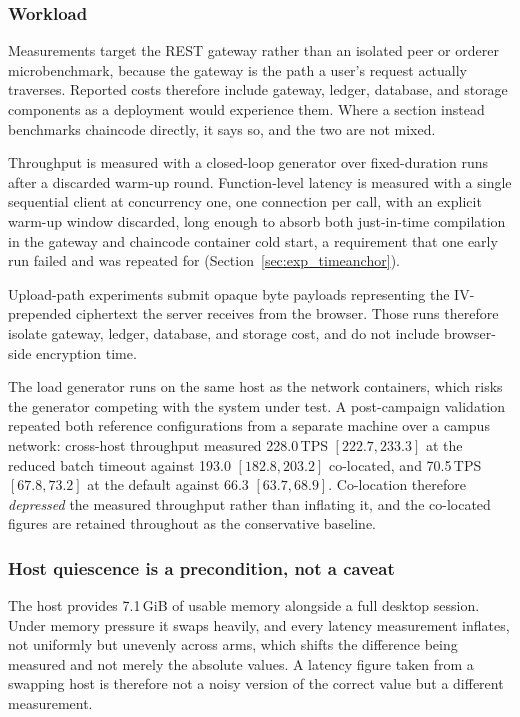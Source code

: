 \documentclass[preprint,12pt]{elsarticle}
\begin{document}
\subsubsection*{Workload}

Measurements target the REST gateway rather than an isolated peer or orderer
microbenchmark, because the gateway is the path a user's request actually
traverses. Reported costs therefore include gateway, ledger, database, and
storage components as a deployment would experience them. Where a section instead
benchmarks chaincode directly, it says so, and the two are not mixed.

Throughput is measured with a closed-loop generator over fixed-duration runs
after a discarded warm-up round. Function-level latency is measured with a
single sequential client at concurrency one, one connection per call, with an
explicit warm-up window discarded, long enough to absorb both just-in-time
compilation in the gateway and chaincode container cold start, a requirement
that one early run failed and was repeated for
(Section~\ref{sec:exp_timeanchor}).

Upload-path experiments submit opaque byte payloads representing the
IV-prepended ciphertext the server receives from the browser. Those runs
therefore isolate gateway, ledger, database, and storage cost, and do not
include browser-side encryption time.

The load generator runs on the same host as the network containers, which risks
the generator competing with the system under test. A post-campaign validation
repeated both reference configurations from a separate machine over a campus
network: cross-host throughput measured 228.0\,TPS $[222.7, 233.3]$ at the
reduced batch timeout against 193.0 $[182.8, 203.2]$ co-located, and 70.5\,TPS
$[67.8, 73.2]$ at the default against 66.3 $[63.7, 68.9]$. Co-location therefore
\emph{depressed} the measured throughput rather than inflating it, and the
co-located figures are retained throughout as the conservative baseline.

\subsubsection*{Host quiescence is a precondition, not a caveat}

The host provides 7.1\,GiB of usable memory alongside a full desktop
session. Under memory pressure it swaps heavily, and every latency measurement
inflates, not uniformly but unevenly across arms, which shifts the difference
being measured and not merely the absolute values. A latency figure taken from
a swapping host is therefore not a noisy version of the correct value but a
different measurement.
\end{document}
